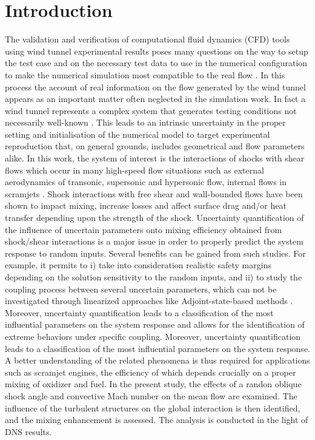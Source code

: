 \documentclass[conf]{new-aiaa}
\begin{document}
\section{Introduction}
%
The validation and verification of computational fluid dynamics (CFD) tools using wind tunnel experimental results poses many questions on the way to setup the test case and on the necessary test data to use in the numerical configuration to make the numerical simulation most compatible to the real flow \cite{szoke2020developing}.
%
In this process the account of real information on the flow generated by the wind tunnel appears as an important matter often neglected in the simulation work.
%
In fact a wind tunnel represents a complex system that generates testing conditions not necessarily well-known \cite{cattafesta2010fundamentals}.
%
This leads to an intrinsic uncertainty in the proper setting and initialisation of the numerical model to target experimental reproduction that, on general grounds, includes geometrical and flow parameters alike.
%
In this work, the system of interest is the interactions of shocks with shear flows which occur in many high-speed flow situations such as external aerodynamics of transonic, supersonic and hypersonic flow, internal flows in scramjets \cite{chakravarthy2018analytical,karthick2021shock}.
%
Shock interactions with free shear and wall-bounded flows have been shown to impact mixing, increase losses and affect surface drag and/or heat transfer depending upon the strength of the shock. 
%
Uncertainty quantification of the influence of uncertain parameters onto mixing efficiency obtained from shock/shear interactions is a major issue in order to properly predict the system response to random inputs.
%
Several benefits can be gained from such studies.
%
For example, it permits to i) take into consideration realistic safety margins depending on the solution sensitivity to the random inputs, and ii) to study the coupling process between several uncertain parameters, which can not be investigated through linearized approaches like Adjoint-state-based methods \cite{mittal2016flexible}.
%
Moreover, uncertainty quantification leads to a classification of the most influential parameters on the system response and allows for the identification of extreme behaviors under specific coupling.
%
Moreover, uncertainty quantification leads to a classification of the most influential parameters on the system response.
%
A better understanding of the related phenomena is thus required for applications such as scramjet engines, the efficiency of which depends crucially on a proper mixing of oxidizer and fuel.
%
In the present study,  the effects of a randon oblique shock angle and convective Mach number on the mean flow are examined. The influence of the turbulent structures on the global interaction is then identified, and the mixing enhancement is assessed.
%
The analysis is conducted in the light of DNS results.
\end{document}
